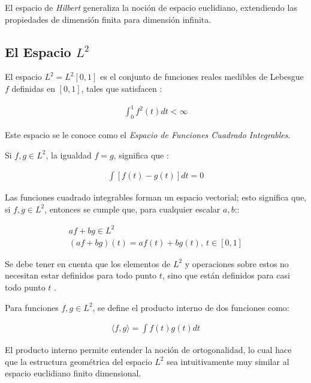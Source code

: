 \documentclass[
]{book}
\begin{document}
El espacio de \emph{Hilbert} generaliza la noción de espacio euclidiano, extendiendo las propiedades de dimensión finita para dimensión infinita.

\hypertarget{el-espacio-l2}{%
\subsection{\texorpdfstring{\textbf{El Espacio} \(L^2\)}{El Espacio L\^{}2}}\label{el-espacio-l2}}

El espacio \(L^2=L^2[0,1]\) es el conjunto de funciones reales medibles de Lebesgue \(f\) definidas en \([0,1]\), tales que satisfacen \citep{lajos}:

\begin{align*}
    \int_0^1 f^2(t)dt<\infty
\end{align*}

Este espacio se le conoce como el \emph{Espacio de Funciones Cuadrado Integrables}.

Si \(f,g \in L^2\), la igualdad \(f=g\), significa que \citep{kokoska}:

\begin{align*}
    \int[f(t)-g(t)]dt=0
\end{align*}

Las funciones cuadrado integrables forman un espacio vectorial; esto significa que, si \(f,g\in L^2\), entonces se cumple que, para cualquier escalar \(a,b\)::

\begin{align*}
        af+bg\in L^2\hspace{2cm}\\
         (af+bg)(t)=af(t)+bg(t),\ t \in [0,1]
  \end{align*}

Se debe tener en cuenta que los elementos de \(L^2\) y operaciones sobre estos no necesitan estar definidos para todo punto \(t\), sino que están definidos para casi todo punto \(t\) \citep{kokoska}.

Para funciones \(f,g\in L^2\), se define el producto interno de dos funciones como:

\begin{align*}
    \langle f,g \rangle=\int f(t)g(t)dt
\end{align*}

El producto interno permite entender la noción de ortogonalidad, lo cual hace que la estructura geométrica del espacio \(L^2\) sea intuitivamente muy similar al espacio euclidiano finito dimensional.
\end{document}
